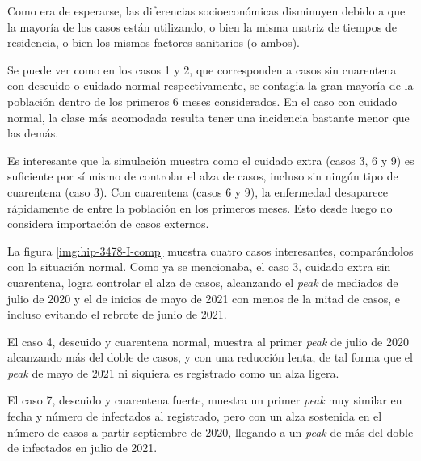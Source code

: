 Como era de esperarse, las diferencias socioeconómicas disminuyen debido a que la mayoría de los casos están utilizando, o bien la misma matriz de tiempos de residencia, o bien los mismos factores sanitarios (o ambos).

Se puede ver como en los casos 1 y 2, que corresponden a casos sin cuarentena con descuido o cuidado normal respectivamente, se contagia la gran mayoría de la población dentro de los primeros 6 meses considerados. En el caso con cuidado normal, la clase más acomodada resulta tener una incidencia bastante menor que las demás.

Es interesante que la simulación muestra como el cuidado extra (casos 3, 6 y 9) es suficiente por sí mismo de controlar el alza de casos, incluso sin ningún tipo de cuarentena (caso 3). Con cuarentena (casos 6 y 9), la enfermedad desaparece rápidamente de entre la población en los primeros meses. Esto desde luego no considera importación de casos externos.






La figura \ref{img:hip-3478-I-comp} muestra cuatro casos interesantes, comparándolos con la situación normal. Como ya se mencionaba, el caso 3, cuidado extra sin cuarentena, logra controlar el alza de casos, alcanzando el \textit{peak} de mediados de julio de 2020 y el de inicios de mayo de 2021 con menos de la mitad de casos, e incluso evitando el rebrote de junio de 2021.

El caso 4, descuido y cuarentena normal, muestra al primer \textit{peak} de julio de 2020 alcanzando más del doble de casos, y con una reducción lenta, de tal forma que el \textit{peak} de mayo de 2021 ni siquiera es registrado como un alza ligera.

El caso 7, descuido y cuarentena fuerte, muestra un primer \textit{peak} muy similar en fecha y número de infectados al registrado, pero con un alza sostenida en el número de casos a partir septiembre de 2020, llegando a un \textit{peak} de más del doble de infectados en julio de 2021.

